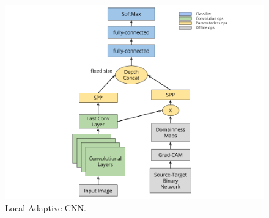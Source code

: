 \documentclass[../main.tex]{subfiles}
\begin{document}
    \begin{figure}[h!]
        \centering{}
        \includegraphics[width=\linewidth]{./img/dmf-architecture.png}
        \caption{Local Adaptive CNN.}\label{fig:dmf-architecture}
    \end{figure}
\end{document}

